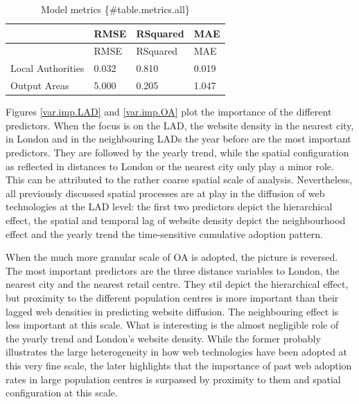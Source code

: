 \documentclass[
  authoryear,
  preprint,
  3p]{elsarticle}
\begin{document}
\begin{longtable}[]{@{}llll@{}}
\caption{Model metrics \{\#table.metrics.all\}}\tabularnewline
\toprule\noalign{}
& RMSE & RSquared & MAE \\
\midrule\noalign{}
\endfirsthead
\toprule\noalign{}
& RMSE & RSquared & MAE \\
\midrule\noalign{}
\endhead
\bottomrule\noalign{}
\endlastfoot
Local Authorities & 0.032 & 0.810 & 0.019 \\
Output Areas & 5.000 & 0.205 & 1.047 \\
\end{longtable}

Figures \ref{var.imp.LAD} and \ref{var.imp.OA} plot the importance of
the different predictors. When the focus is on the LAD, the website
density in the nearest city, in London and in the neighbouring LADs the
year before are the most important predictors. They are followed by the
yearly trend, while the spatial configuration as reflected in distances
to London or the nearest city only play a minor role. This can be
attributed to the rather coarse spatial scale of analysis. Nevertheless,
all previously discussed spatial processes are at play in the diffusion
of web technologies at the LAD level: the first two predictors depict
the hierarchical effect, the spatial and temporal lag of website density
depict the neighbourhood effect and the yearly trend the time-sensitive
cumulative adoption pattern.

When the much more granular scale of OA is adopted, the picture is
reversed. The most important predictors are the three distance variables
to London, the nearest city and the nearest retail centre. They stil
depict the hierarchical effect, but proximity to the different
population centres is more important than their lagged web densities in
predicting website diffusion. The neighbouring effect is less important
at this scale. What is interesting is the almost negligible role of the
yearly trend and London's website density. While the former probably
illustrates the large heterogeneity in how web technologies have been
adopted at this very fine scale, the later highlights that the
importance of past web adoption rates in large population centres is
surpassed by proximity to them and spatial configuration at this scale.
\end{document}
